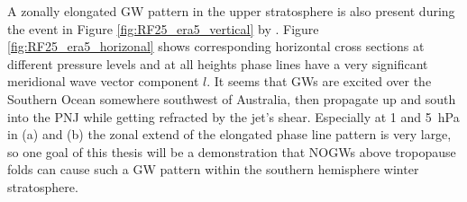 A zonally elongated GW pattern in the upper stratosphere is also present during the event in Figure \ref{fig:RF25_era5_vertical} by \textcite[]{dornbrack_stratospheric_2022}. Figure \ref{fig:RF25_era5_horizonal} shows corresponding horizontal cross sections at different pressure levels and at all heights phase lines have a very significant meridional wave vector component $l$. It seems that GWs are excited over the Southern Ocean somewhere southwest of Australia, then propagate up and south into the PNJ while getting refracted by the jet's shear. Especially at 1 and \SI{5}{hPa} in (a) and (b) the zonal extend of the elongated phase line pattern is very large, so one goal of this thesis will be a demonstration that NOGWs above tropopause folds can cause such a GW pattern within the southern hemisphere winter stratosphere.  

